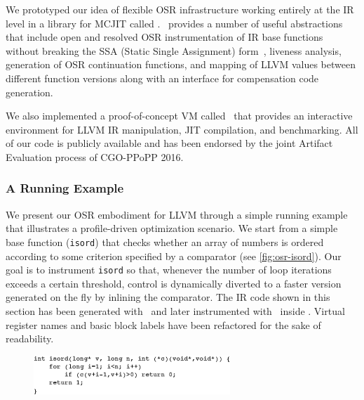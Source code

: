 We prototyped our idea of flexible OSR infrastructure working entirely at the IR level in a library for MCJIT called \osrkit. \osrkit\ provides a number of useful abstractions that include open and resolved OSR instrumentation of IR base functions without breaking the SSA (Static Single Assignment) form~\cite{Cytron91}, liveness analysis, generation of OSR continuation functions, and mapping of LLVM values between different function versions along with an interface for compensation code generation.

We also implemented a proof-of-concept VM called \tinyvm\ that provides an interactive environment for LLVM IR manipulation, JIT compilation, and benchmarking. All of our code is publicly available and has been endorsed by the joint Artifact Evaluation process of CGO-PPoPP 2016.

\subsubsection*{A Running Example}
We present our OSR embodiment for LLVM through a simple running example that illustrates a profile-driven optimization scenario. We start from a simple base function ({\tt isord}) that checks whether an array of numbers is ordered according to some criterion specified by a comparator (see \myfigure\ref{fig:osr-isord}). Our goal is to instrument {\tt isord} so that, whenever the number of loop iterations exceeds a certain threshold, control is dynamically diverted to a faster version generated on the fly by inlining the comparator. The IR code shown in this section has been generated with \clang\ and later instrumented with \osrkit\ inside \tinyvm. Virtual register names and basic block labels have been refactored for the sake of readability.

\ifdefined\noauthorea
\begin{figure}[t]
\begin{center}
\includegraphics[width=0.66\textwidth]{figures/osr-isord/osr-isord.eps}
\caption{\protect}
\end{center}
\end{figure}
\fi

